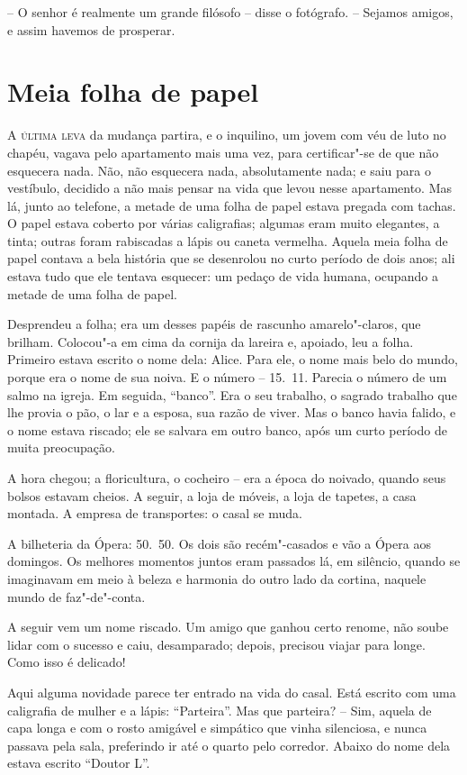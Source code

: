 -- O senhor é realmente um grande filósofo -- disse o fotógrafo. -- Sejamos
amigos, e assim havemos de \mbox{prosperar.}

\chapter{Meia folha de papel}


\textsc{A última leva} da mudança partira, e o inquilino, um jovem com véu de
luto no chapéu, vagava pelo apartamento mais uma vez, para
certificar"-se de que não esquecera nada. Não, não esquecera nada,
absolutamente nada; e saiu para o vestíbulo, decidido a não mais pensar
na vida que levou nesse apartamento. Mas lá, junto ao telefone, a
metade de uma folha de papel estava pregada com tachas. O papel estava
coberto por várias caligrafias; algumas eram muito elegantes, a tinta;
outras foram rabiscadas a lápis ou caneta vermelha. Aquela meia folha
de papel contava a bela história que se desenrolou no curto período de
dois anos; ali estava tudo que ele tentava esquecer: um pedaço de vida
humana, ocupando a metade de uma folha de papel.

Desprendeu a folha; era um desses papéis de rascunho amarelo"-claros,
que brilham. Colocou"-a em cima da cornija da lareira e, apoiado, leu
a folha. Primeiro estava escrito o nome dela: Alice. Para ele, o nome
mais belo do mundo, porque era o nome de sua noiva. E o número -- 15.~11.
Parecia o número de um salmo na igreja. Em seguida, ``banco''. Era o seu
trabalho, o sagrado trabalho que lhe provia o pão, o lar e a esposa,
sua razão de viver. Mas o banco havia falido, e o nome estava riscado;
ele se salvara em outro banco, após um curto período de muita
preocupação.

A hora chegou; a floricultura, o cocheiro -- era a época do noivado,
quando seus bolsos estavam cheios. A seguir, a loja de móveis, a loja
de tapetes, a casa montada. A empresa de transportes: o casal se muda.

A bilheteria da Ópera: 50.~50. Os dois são recém"-casados e vão a Ópera
aos domingos. Os melhores momentos juntos eram passados lá, em
silêncio, quando se imaginavam em meio à beleza e harmonia do outro
lado da cortina, naquele mundo de faz"-de"-conta.

A seguir vem um nome riscado. Um amigo que ganhou certo renome, não
soube lidar com o sucesso e caiu, desamparado; depois, precisou viajar
para longe. Como isso é delicado!

Aqui alguma novidade parece ter entrado na vida do casal. Está escrito
com uma caligrafia de mulher e a lápis: ``Parteira''. Mas que parteira? --
Sim, aquela de capa longa e com o rosto amigável e simpático que vinha
silenciosa, e nunca passava pela sala, preferindo ir até o quarto pelo
corredor. Abaixo do nome dela estava escrito ``Doutor L''.


